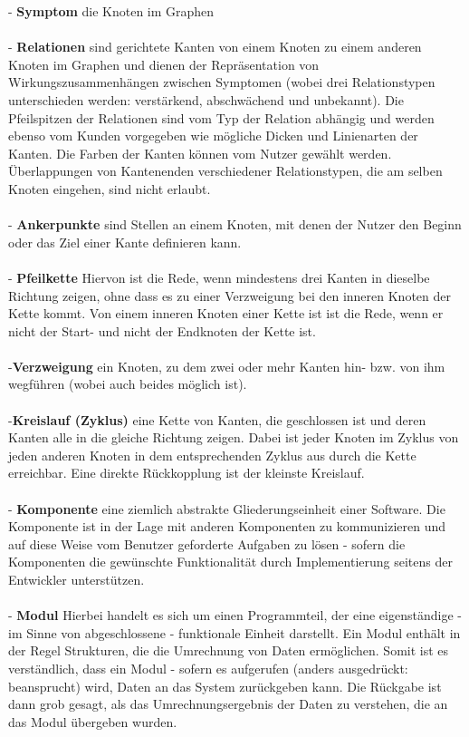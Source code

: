 \documentclass[enabledeprecatedfontcommands,fontsize=11pt,paper=a4,twoside]{scrartcl}
\newcounter{one}
\begin{document}
- \textbf{\hypertarget{Symptom}{Symptom}} die Knoten im Graphen  \\ \\
- \textbf{Relationen} sind gerichtete Kanten von einem Knoten zu einem anderen Knoten im Graphen und dienen der Repräsentation von Wirkungszusammenhängen zwischen Symptomen (wobei drei Relationstypen unterschieden werden: verstärkend, abschwächend und unbekannt). Die Pfeilspitzen der Relationen sind vom Typ der Relation abhängig und werden ebenso vom Kunden vorgegeben wie mögliche Dicken und Linienarten der Kanten. Die Farben der Kanten können vom Nutzer gewählt werden. Überlappungen von Kantenenden verschiedener Relationstypen, die am selben Knoten eingehen, sind nicht erlaubt. \\ \\
- \textbf{Ankerpunkte}  sind Stellen an einem Knoten, mit denen der Nutzer den Beginn oder das Ziel einer Kante definieren kann. \\ \\
- \textbf{Pfeilkette} Hiervon ist die Rede, wenn mindestens drei Kanten in dieselbe Richtung zeigen, ohne dass es zu einer Verzweigung bei den inneren Knoten der Kette kommt. Von einem inneren Knoten einer Kette ist ist die Rede, wenn er nicht der Start- und nicht der Endknoten der Kette ist. \\ \\
-\textbf{Verzweigung} ein Knoten, zu dem zwei oder mehr Kanten hin- bzw. von ihm wegführen (wobei auch beides möglich ist). \\ \\
-\textbf{\hypertarget{Kreislauf}{Kreislauf (Zyklus)}} eine Kette von Kanten, die geschlossen ist und deren Kanten alle in die gleiche Richtung zeigen. Dabei ist jeder Knoten im Zyklus von jeden anderen Knoten in dem entsprechenden Zyklus aus durch die Kette erreichbar. Eine direkte Rückkopplung ist der kleinste Kreislauf. \\ \\
- \textbf{Komponente} eine ziemlich abstrakte Gliederungseinheit einer Software. Die Komponente ist in der Lage mit anderen Komponenten zu kommunizieren und auf diese Weise vom Benutzer geforderte Aufgaben zu lösen - sofern die Komponenten die gewünschte Funktionalität durch Implementierung seitens der Entwickler unterstützen. \\ \\
- \textbf{Modul} Hierbei handelt es sich um einen Programmteil, der eine eigenständige - im Sinne von abgeschlossene - funktionale Einheit darstellt. Ein Modul enthält in der Regel Strukturen, die die Umrechnung von Daten ermöglichen. Somit ist es verständlich, dass ein Modul - sofern es aufgerufen (anders ausgedrückt: beansprucht) wird, Daten an das System zurückgeben kann. Die Rückgabe ist dann grob gesagt, als das Umrechnungsergebnis der Daten zu verstehen, die an das Modul übergeben wurden. \\ \\
\end{document}
